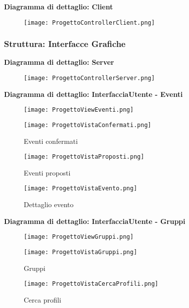 \textbf{Diagramma di dettaglio: Client}
\begin{figure}[h!]
    \begin{center}
        \texttt{[image: ProgettoControllerClient.png]}
    \end{center}
\end{figure}


\clearpage

\subsubsection{Struttura: Interfacce Grafiche}

\textbf{Diagramma di dettaglio: Server}
\begin{figure}[h!]
    \begin{center}
        \texttt{[image: ProgettoControllerServer.png]}
    \end{center}
\end{figure}

\newpage



\textbf{Diagramma di dettaglio: InterfacciaUtente - Eventi}
\begin{figure}[h!]
    \begin{center}
        \texttt{[image: ProgettoViewEventi.png]}
    \end{center}
\end{figure}
\begin{figure}[h!]
    \centering
    \texttt{[image: ProgettoVistaConfermati.png]}
    \caption{Eventi confermati}
\end{figure}
\begin{figure}[h!]
    \centering
    \texttt{[image: ProgettoVistaProposti.png]}
    \caption{Eventi proposti}
\end{figure}
\begin{figure}[h!]
    \centering
    \texttt{[image: ProgettoVistaEvento.png]}
    \caption{Dettaglio evento}
\end{figure}
\clearpage

\textbf{Diagramma di dettaglio: InterfacciaUtente - Gruppi}
\begin{figure}[h!]
    \begin{center}
        \texttt{[image: ProgettoViewGruppi.png]}
    \end{center}
\end{figure}
\begin{figure}[h!]
    \centering
    \texttt{[image: ProgettoVistaGruppi.png]}
    \caption{Gruppi}
\end{figure}
\begin{figure}[h!]
    \centering
    \texttt{[image: ProgettoVistaCercaProfili.png]}
    \caption{Cerca profili}
\end{figure}
\clearpage

